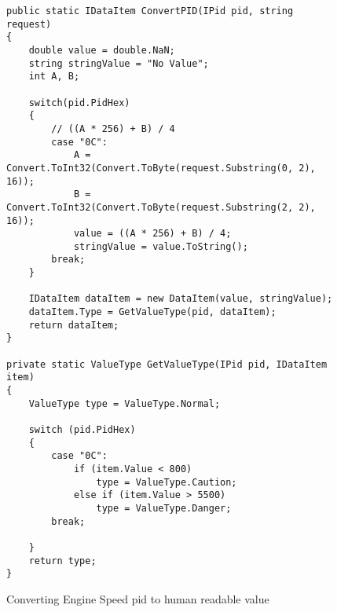 {		\begin{figure}[h]
			\begin{lstlisting}
public static IDataItem ConvertPID(IPid pid, string request)
{
	double value = double.NaN;
	string stringValue = "No Value";
	int A, B;

	switch(pid.PidHex)
	{
		// ((A * 256) + B) / 4
		case "0C":    
			A = Convert.ToInt32(Convert.ToByte(request.Substring(0, 2), 16));
			B = Convert.ToInt32(Convert.ToByte(request.Substring(2, 2), 16));
			value = ((A * 256) + B) / 4;
			stringValue = value.ToString();
		break;
	}

	IDataItem dataItem = new DataItem(value, stringValue);
	dataItem.Type = GetValueType(pid, dataItem);
    return dataItem;
}

private static ValueType GetValueType(IPid pid, IDataItem item)
{
	ValueType type = ValueType.Normal;
				
	switch (pid.PidHex)
	{
		case "0C":		
			if (item.Value < 800)
				type = ValueType.Caution;
			else if (item.Value > 5500)
				type = ValueType.Danger;
		break;

	}
	return type;
}
			\end{lstlisting}
			\caption{Converting Engine Speed pid to human readable value}
			\label{code:ConvertingPids}
		\end{figure}		
			
		\paragraph{}{
		}			
		
		\label{ssec:DataModuleDesc}
	}
